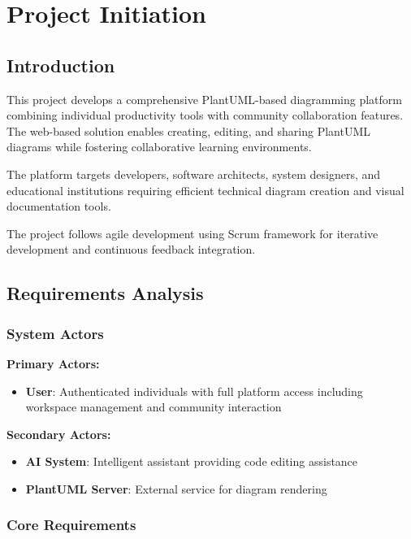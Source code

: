 \chapter{Project Initiation}

\section{Introduction}

This project develops a comprehensive PlantUML-based diagramming platform combining individual productivity tools with community collaboration features. The web-based solution enables creating, editing, and sharing PlantUML diagrams while fostering collaborative learning environments.

The platform targets developers, software architects, system designers, and educational institutions requiring efficient technical diagram creation and visual documentation tools.

The project follows agile development using Scrum framework for iterative development and continuous feedback integration.

\section{Requirements Analysis}

\subsection{System Actors}

\textbf{Primary Actors:}
\begin{itemize}
    \item \textbf{User}: Authenticated individuals with full platform access including workspace management and community interaction
\end{itemize}

\textbf{Secondary Actors:}
\begin{itemize}
    \item \textbf{AI System}: Intelligent assistant providing code editing assistance
    \item \textbf{PlantUML Server}: External service for diagram rendering
\end{itemize}

\subsection{Core Requirements}

